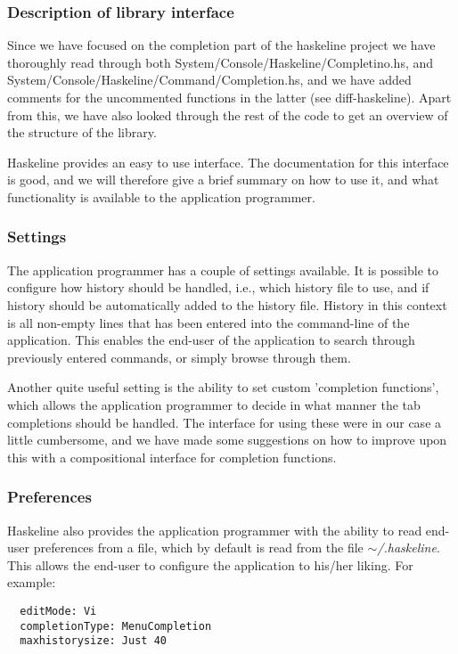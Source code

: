 \documentclass[11pt,a4paper]{article}
\begin{document}
\subsubsection{Description of library interface}
Since we have focused on the completion part of the haskeline project we have
thoroughly read through both System/Console/Haskeline/Completino.hs, and
System/Console/Haskeline/Command/Completion.hs, and we have added comments for
the uncommented functions in the latter (see diff-haskeline). Apart from
this, we have also looked through the rest of the code to get an overview of
the structure of the library.

Haskeline provides an easy to use interface. The documentation for this
interface is good, and we will therefore give a brief summary on how to use it,
and what functionality is available to the application programmer.

\subsubsection{Settings}
The application programmer has a couple of settings available. It is possible to
configure how history should be handled, i.e., which history file to use, and if
history should be automatically added to the history file. History in this
context is all non-empty lines that has been entered into the command-line of
the application. This enables the end-user of the application to search through
previously entered commands, or simply browse through them.

Another quite useful setting is the ability to set custom 'completion
functions', which allows the application programmer to decide in what manner the
tab completions should be handled. The interface for using these were in our
case a little cumbersome, and we have made some suggestions on how to improve
upon this with a compositional interface for completion functions.

\subsubsection{Preferences}
Haskeline also provides the application programmer with the ability to read
end-user preferences from a file, which by default is read from the file
$\mathtt{\sim}$\textit{/.haskeline}. This allows the end-user to configure the
application to his/her liking. For example:

\begin{verbatim}
  editMode: Vi
  completionType: MenuCompletion
  maxhistorysize: Just 40
\end{verbatim}
\end{document}
